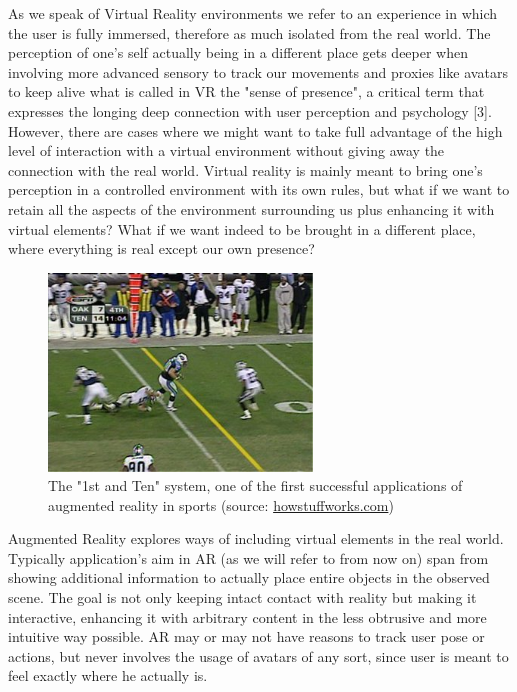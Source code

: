 As we speak of Virtual Reality environments we refer to an experience in which the user is fully immersed, therefore as much isolated from the real world. The perception of one’s self actually being in a different place gets deeper when involving more advanced sensory to track our movements and proxies like avatars to keep alive what is called in VR the "sense of presence", a critical term that expresses the longing deep connection with user perception and psychology [3]. However, there are cases where we might want to take full advantage of the high level of interaction with a virtual environment without giving away the connection with the real world. Virtual reality is mainly meant to bring one’s perception in a controlled environment with its own rules, but what if we want to retain all the aspects of the environment surrounding us plus enhancing it with virtual elements? What if we want indeed to be brought in a different place, where everything is real except our own presence?
\begin{figure}
\centering
\includegraphics[width=7cm]{pictures/1st_and_ten}
\caption{The "1st and Ten" system, one of the first successful applications of augmented reality in sports (source: \href{http://www.howstuffworks.com/first-down-line.htm}{howstuffworks.com})}
\label{fig:rugby_ar}
\end{figure}

Augmented Reality explores ways of including virtual elements in the real world. Typically application’s aim in AR (as we will refer to from now on) span from showing additional information to actually place entire objects in the observed scene. The goal is not only keeping intact contact with reality but making it interactive, enhancing it with arbitrary content in the less obtrusive and more intuitive way possible. AR may or may not have reasons to track user pose or actions, but never involves the usage of avatars of any sort, since user is meant to feel exactly where he actually is.

